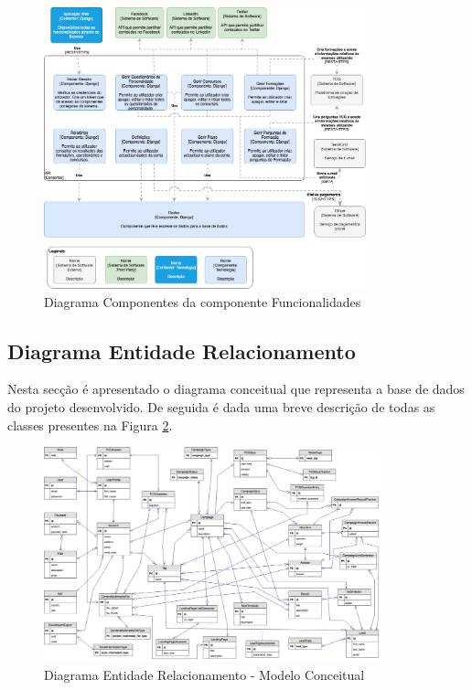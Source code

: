 \begin{figure}[ht!]
	\begin{center}
		\includegraphics[width=0.83\textwidth]{img/arq/diagrama-componentes1}
		\caption{Diagrama Componentes da componente Funcionalidades}
		\label{fig:arq-componentes1}
	\end{center}
\end{figure}

\newpage


\subsection{Diagrama Entidade Relacionamento}

Nesta secção é apresentado o diagrama conceitual que representa a base de dados do projeto desenvolvido. De seguida é dada uma breve descrição de todas as classes presentes na Figura \ref{fig:arq-er}. 

\begin{figure}[ht!]
	\begin{center}
		\includegraphics[width=0.87\textwidth]{img/arq/er}
		\caption{Diagrama Entidade Relacionamento - Modelo Conceitual}
		\label{fig:arq-er}
	\end{center}
\end{figure}

